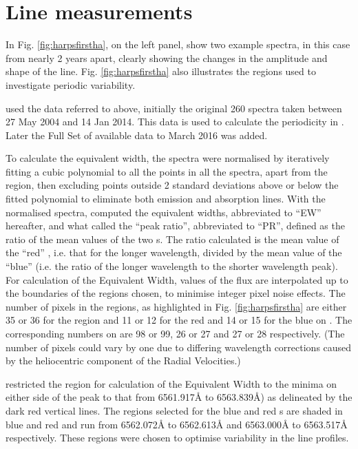 \section{{\ha} Line measurements}
\protect\label{section:linemeas}

In Fig. \ref{fig:harpsfirstha}, on the left panel, {\Firstp} show two example spectra, in this case from {\harps} nearly
2 years apart, clearly showing the changes in the amplitude and shape of the {\ha} line. Fig. \ref{fig:harpsfirstha}
also illustrates the regions used to investigate periodic variability.

{\FirstP} used the {\harps} data referred to above, initially the original 260 spectra taken between 27 May 2004 and 14
Jan 2014. This data is used to calculate the periodicity in \citet[Table 3]{suarezmascareno15}. Later the Full Set of
available data to March 2016 was added.

To calculate the equivalent width, the spectra were normalised by iteratively fitting a cubic polynomial to all the
points in all the spectra, apart from the {\ha} region, then excluding points outside 2 standard deviations above or
below the fitted polynomial to eliminate both emission and absorption lines. With the normalised spectra, {\Firstp}
computed the equivalent widths, abbreviated to ``EW'' hereafter, and what {\Firstp} called the ``peak ratio'',
abbreviated to ``PR'', defined as the ratio of the mean values of the two \horn s. The ratio calculated is the mean
value of the ``red'' \horn, i.e. that for the longer wavelength, divided by the mean value of the ``blue'' {\horn}
(i.e. the ratio of the longer wavelength to the shorter wavelength peak). For calculation of the Equivalent Width,
values of the flux are interpolated up to the boundaries of the regions chosen, to minimise integer pixel noise
effects. The number of pixels in the regions, as highlighted in Fig. \ref{fig:harpsfirstha} are either 35 or 36 for the
{\ha} region and 11 or 12 for the red {\horn} and 14 or 15 for the blue {\horn} on {\uves}. The corresponding numbers on
{\harps} are 98 or 99, 26 or 27 and 27 or 28 respectively. (The number of pixels could vary by one due to differing
wavelength corrections caused by the heliocentric component of the Radial Velocities.)

{\FirstP} restricted the {\ha} region for calculation of the Equivalent Width to the minima on either side of the peak
to that from 6561.917{\AA} to 6563.839\AA) as delineated by the dark red vertical lines. The regions selected for the
blue and red \horn s are shaded in blue and red and run from 6562.072{\AA} to 6562.613{\AA} and 6563.000{\AA} to
6563.517{\AA} respectively. These regions were chosen to optimise variability in the line profiles.

